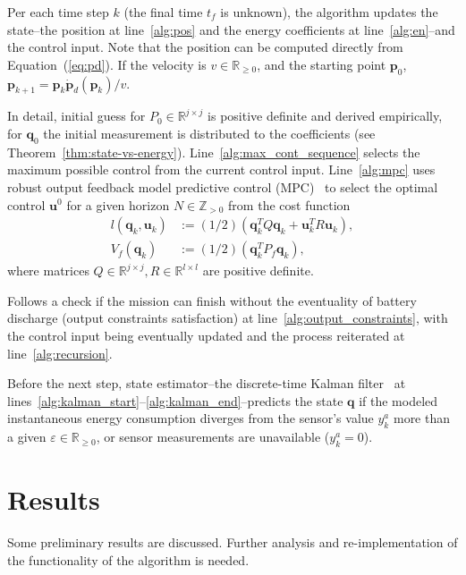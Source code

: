 \documentclass[letterpaper,10pt,conference]{ieeeconf}
\theoremstyle{definition}
\begin{document}
Per each time step $k$ (the final time $t_f$ is unknown), the algorithm updates the state--the position at line~\ref{alg:pos} and the energy coefficients at line~\ref{alg:en}--and the control input. Note that the position can be computed directly from Equation~(\ref{eq:pd}). If the velocity is $v\in\mathbb{R}_{\geq 0}$, and the starting point $\mathbf{p}_0$, $\mathbf{p}_{k+1}=\mathbf{p}_k\dot{\mathbf{p}}_d(\mathbf{p}_k)/v$.
  
In detail, initial guess for $P_0\in\mathbb{R}^{j\times j}$ is positive definite and derived empirically, for $\mathbf{q}_0$ the initial measurement is distributed to the coefficients (see Theorem~\ref{thm:state-vs-energy}). Line~\ref{alg:max_cont_sequence} selects the maximum possible control from the current control input. Line~\ref{alg:mpc} uses robust output feedback model predictive control (MPC)~\cite{rawlings2017model} to select the optimal control $\mathbf{u}^0$ for a given horizon $N\in\mathbb{Z}_{>0}$ from the cost function
\begin{equation}\begin{split}
  l(\mathbf{q}_k,\mathbf{u}_k)&:=(1/2)(\mathbf{q}_k^TQ\mathbf{q}_k+\mathbf{u}_k^TR\mathbf{u}_k),\\
  V_f(\mathbf{q}_k)&:=(1/2)(\mathbf{q}_k^TP_f\mathbf{q}_k),
\end{split}\end{equation}
where matrices $Q\in\mathbb{R}^{j\times j},R\in\mathbb{R}^{l\times l}$ are positive definite.

Follows a check if the mission can finish without the eventuality of battery discharge (output constraints satisfaction) at line~\ref{alg:output_constraints}, with the control input being eventually updated and the process reiterated at line~\ref{alg:recursion}.

Before the next step, state estimator--the discrete-time Kalman filter~\cite{simon2006optimal} at lines~\ref{alg:kalman_start}--\ref{alg:kalman_end}--predicts the state $\mathbf{q}$ if the modeled instantaneous energy consumption diverges from the sensor's value $y_k^a$ more than a given $\varepsilon\in\mathbb{R}_{\geq  0}$, or sensor measurements are unavailable ($y_k^a=0$).


\section{Results}
\label{sec:experimental}

Some preliminary results are discussed. Further analysis and re-implementation of the functionality of the algorithm is needed.
\end{document}

